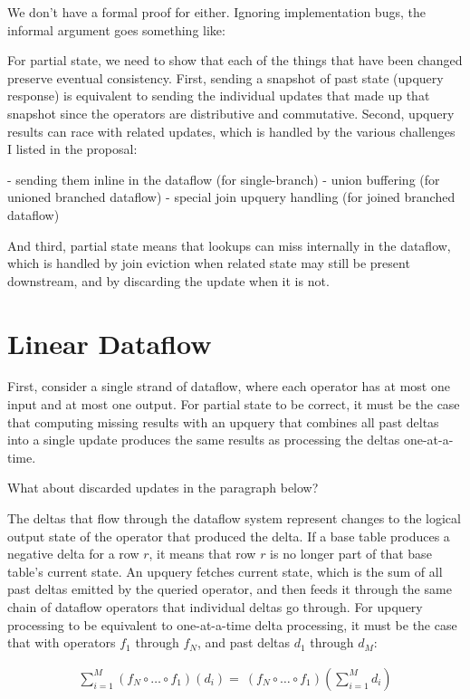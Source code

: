 We don't have a formal proof for either. Ignoring implementation bugs, the
informal argument goes something like:

For partial state, we need to show that each of the things that have been
changed preserve eventual consistency. First, sending a snapshot of past state
(upquery response) is equivalent to sending the individual updates that made
up that snapshot since the operators are distributive and commutative. Second,
upquery results can race with related updates, which is handled by the various
challenges I listed in the proposal:

 - sending them inline in the dataflow (for single-branch)
 - union buffering (for unioned branched dataflow)
 - special join upquery handling (for joined branched dataflow)

And third, partial state means that lookups can miss internally in the
dataflow, which is handled by join eviction when related state may still be
present downstream, and by discarding the update when it is not.

\section{Linear Dataflow}

First, consider a single strand of dataflow, where each operator has at most one
input and at most one output. For partial state to be correct, it must be the
case that computing missing results with an upquery that combines all past
deltas into a single update produces the same results as processing the deltas
one-at-a-time.

\begin{inprogress}
  What about discarded updates in the paragraph below?
\end{inprogress}

The deltas that flow through the dataflow system represent changes to the
logical output state of the operator that produced the delta. If a base table
produces a negative delta for a row $r$, it means that row $r$ is no longer part
of that base table's current state. An upquery fetches current state, which is
the sum of all past deltas emitted by the queried operator, and then feeds it
through the same chain of dataflow operators that individual deltas go through.
For upquery processing to be equivalent to one-at-a-time delta processing, it
must be the case that with operators $f_1$ through $f_N$, and past deltas $d_1$
through $d_M$:

\begin{eqnarray*}
  \sum^M_{i=1}\left(f_N \circ \dots \circ f_1\right)\left(d_i\right) = \
  \left(f_N \circ \dots \circ f_1\right)\left(\sum^M_{i=1}d_i\right)
\end{eqnarray*}

